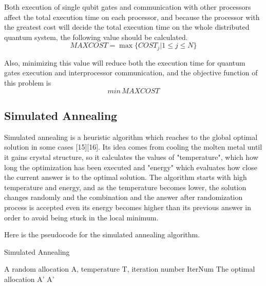 Both execution of single qubit gates and communication with other processors affect the total execution time on each processor, and because the processor with the greatest cost will decide the total execution time on the whole distributed quantum system, the following value should be calculated.
$$MAXCOST = \max \{COST_j | 1 \leq j \leq N\}$$

Also, minimizing this value will reduce both the execution time for quantum gates execution and interprocessor communication, and the objective function of this problem is 
$$ min\,MAXCOST$$

\newpage
\subsection{Simulated Annealing}
Simulated annealing is a heuristic algorithm which reaches to the global optimal solution in some cases [15][16]. Its idea comes from cooling the molten metal until it gains crystal structure, so it calculates the values of "temperature", which how long the optimization has been executed and "energy" which evaluates how close the current answer is to the optimal solution.  The algorithm starts with high temperature and energy, and as the temperature becomes lower,  the solution changes randomly and the combination and the answer after randomization process is accepted even its energy becomes higher than its previous answer in order to avoid being stuck in the local minimum.

Here is the pseudocode for the simulated annealing algorithm.

\begin{algorithm}
 \caption{Simulated Annealing}
  \begin{algorithmic}[1]
  \Require A random allocation A, temperature T, iteration number IterNum
  \Ensure The optimal allocation A'
    \EndIf
 \EndFor
       \State \Return A'
\EndFunction
 \end{algorithmic}
 \end{algorithm}
 
